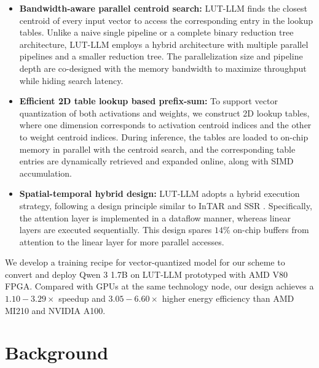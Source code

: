 \documentclass[conference]{IEEEtran}
\begin{document}
\begin{itemize}[wide=0pt]
  \item \textbf{Bandwidth-aware parallel centroid search:} LUT-LLM finds the closest centroid of every input vector to access the corresponding entry in the lookup tables. Unlike a naive single pipeline \cite{li2025lut} or a complete binary reduction tree architecture, LUT-LLM employs a hybrid architecture with multiple parallel pipelines and a smaller reduction tree. The parallelization size and pipeline depth are co-designed with the memory bandwidth to maximize throughput while hiding search latency.

  \item \textbf{Efficient 2D table lookup based prefix-sum:} To support vector quantization of both activations and weights, we construct 2D lookup tables, where one dimension corresponds to activation centroid indices and the other to weight centroid indices. During inference, the tables are loaded to on-chip memory in parallel with the centroid search, and the corresponding table entries are dynamically retrieved and expanded online, along with SIMD accumulation.

  \item \textbf{Spatial-temporal hybrid design:} LUT-LLM adopts a hybrid execution strategy, following a design principle similar to InTAR \cite{he2025intar} and SSR \cite{zhuang2024ssr}. Specifically, the attention layer is implemented in a dataflow manner, whereas linear layers are executed sequentially. This design spares $14\%$ on-chip buffers from attention to the linear layer for more parallel accesses.

\end{itemize}
We develop a training recipe for vector-quantized model for our scheme to convert and deploy Qwen 3 1.7B on LUT-LLM prototyped with AMD V80 FPGA. Compared with GPUs at the same technology node, our design achieves a $1.10-3.29 \times$ speedup and $3.05-6.60\times$ higher energy efficiency than AMD MI210 and NVIDIA A100.



\section{Background}

\end{document}
